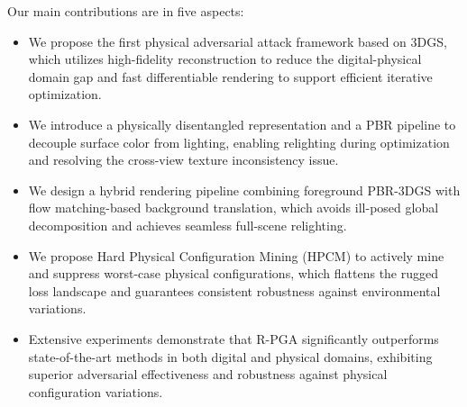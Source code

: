 \documentclass[10pt,journal,compsoc]{IEEEtran}
\begin{document}
Our main contributions are in five aspects:
\begin{itemize}
\item We propose the first physical adversarial attack framework based on 3DGS, which utilizes high-fidelity reconstruction to reduce the digital-physical domain gap and fast differentiable rendering to support efficient iterative optimization.
\item We introduce a physically disentangled representation and a PBR pipeline to decouple surface color from lighting, enabling relighting during optimization and resolving the cross-view texture inconsistency issue.
\item We design a hybrid rendering pipeline combining foreground PBR-3DGS with flow matching-based background translation, which avoids ill-posed global decomposition and achieves seamless full-scene relighting.
\item We propose Hard Physical Configuration Mining (HPCM) to actively mine and suppress worst-case physical configurations, which flattens the rugged loss landscape and guarantees consistent robustness against environmental variations.
\item Extensive experiments demonstrate that R-PGA significantly outperforms state-of-the-art methods in both digital and physical domains, exhibiting superior adversarial effectiveness and robustness against physical configuration variations.


\end{itemize}
\end{document}

